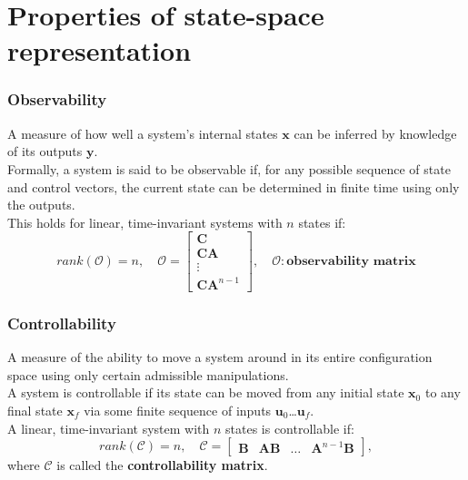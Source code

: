 \section{Properties of state-space representation}

\begin{frame}
\frametitle{Observability}
A measure of how well a system's internal states $\mathbf{x}$ can be inferred by knowledge of its outputs $\mathbf{y}$. \\
Formally, a system is said to be observable if, for any possible sequence of state and control vectors, the current state can be determined in finite time using only the outputs. \\
This holds for linear, time-invariant systems with $n$ states if:
\begin{equation*}
rank(\mathcal{O}) = n,\quad \mathcal{O} = \begin{bmatrix} \mathbf{C} \\ \mathbf{CA} \\ \vdots \\ \mathbf{CA}^{n-1} \end{bmatrix}, \quad \mathcal{O}: \textbf{observability matrix}
\end{equation*}

\end{frame}

\begin{frame}
\frametitle{Controllability}
A measure of the ability to move a system around in its entire configuration space using only certain admissible manipulations. \\
A system is controllable if its state can be moved from any initial state $\mathbf{x}_0$ to any final state $\mathbf{x}_f$ via some finite sequence of inputs $\mathbf{u}_0$\ldots$\mathbf{u}_f$. \\
A linear, time-invariant system with $n$ states is controllable if:
\begin{equation*}
rank(\mathcal{C}) = n,\quad \mathcal{C} = \begin{bmatrix} \mathbf{B} & \mathbf{AB} & \ldots & \mathbf{A}^{n-1}\mathbf{B} \end{bmatrix},
\end{equation*}
where $\mathcal{C}$ is called the \textbf{controllability matrix}.

\end{frame}


